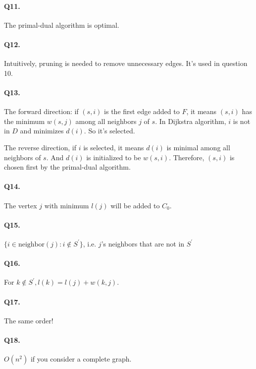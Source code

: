 \documentclass{article}
\begin{document}
\paragraph{Q11. }

The primal-dual algorithm is optimal. 

\paragraph{Q12. }

Intuitively, pruning is needed to remove unnecessary edges. It's used in question 10. 

\paragraph{Q13. }

The forward direction: if $(s, i)$ is the first edge added to $F$, it means $(s, i)$ has the minimum $w(s, j)$ among all neighbors $j$ of $s$.
In Dijkstra algorithm, $i$ is not in $D$ and minimizes $d(i)$. So it's selected.

The reverse direction, if $i$ is selected, it means $d(i)$ is minimal among all neighbors of $s$. And $d(i)$ is initialized to be $w(s, i)$. Therefore, $(s, i)$ is chosen first by the primal-dual algorithm. 

\paragraph{Q14. }

The vertex $j$ with minimum $l(j)$ will be added to $C_0$. 

\paragraph{Q15. }

$\{i \in \text{neighbor}(j): i \not\in S^{'}\}$, i.e. $j$'s neighbors that are not in $S^{'}$ 

\paragraph{Q16. }

For $k \not\in S^{'}, l(k) = l(j) + w(k, j)$. 

\paragraph{Q17. }

The same order! 

\paragraph{Q18. }

$O(n^2)$ if you consider a complete graph. 
\end{document}
